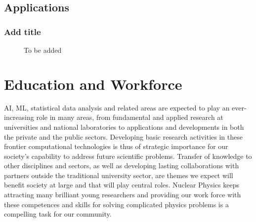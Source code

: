 \documentclass[%
10pt]{article}
\begin{document}
\clearpage
\newpage

\subsection{Applications}
\subsubsection{Add title}
\vspace{5mm}
\noindent
{}
\begin{figure}[htb!]
\centering
\caption{To be added}
\end{figure}
\clearpage
\newpage



\section{Education and Workforce}

AI, ML, statistical data analysis and related areas are expected to
play an ever-increasing role in many areas, from fundamental and
applied research at universities and national laboratories to
applications and developments in both the private and the public
sectors.
Developing basic research activities in these frontier
computational technologies is thus of strategic importance for our
society’s capability to address future scientific problems. Transfer
of knowledge to other disciplines and sectors, as well as developing
lasting collaborations with partners outside the traditional
university sector, are themes we expect will benefit society at large
and that will play central roles. Nuclear Physics keeps attracting many brilliant young researchers and providing our work force with these competences and skills for solving complicated physics problems is a compelling task for our community.
\end{document}
